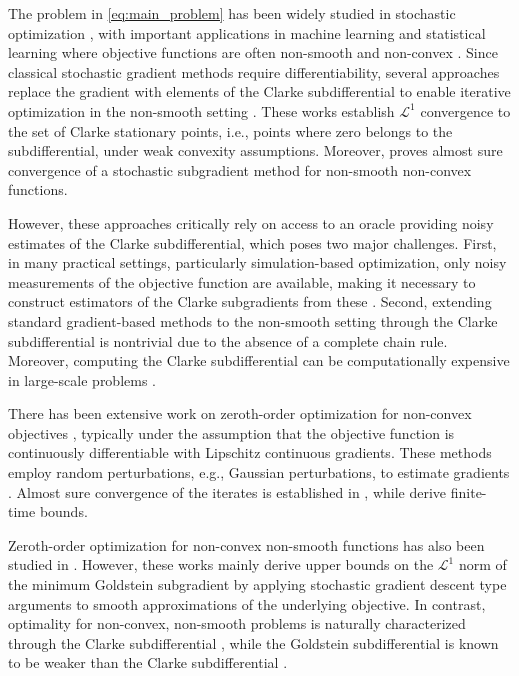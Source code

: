 \documentclass[9pt,journal,twoside,web]{ieeecolor}
\begin{document}
The problem in \eqref{eq:main_problem} has been widely studied in stochastic optimization \cite{ermoliev2003solution,bolte2021conservative,xu2019non,mai2020convergence,lin2022gradient}, with important applications in machine learning and statistical learning where objective functions are often non-smooth and non-convex \cite{bolte2021conservative}. Since classical stochastic gradient methods require differentiability, several approaches replace the gradient with elements of the Clarke subdifferential to enable iterative optimization in the non-smooth setting \cite{xu2019non,mai2020convergence}. These works establish $\mathcal{L}^1$ convergence to the set of Clarke stationary points, i.e., points where zero belongs to the subdifferential, under weak convexity assumptions. Moreover, \cite{bianchi2022convergence} proves almost sure convergence of a stochastic subgradient method for  non-smooth non-convex functions.

However, these approaches critically rely on access to an oracle providing noisy estimates of the Clarke subdifferential, which poses two major challenges. First, in many practical settings, particularly simulation-based optimization, only noisy measurements of the objective function are available, making it necessary to construct estimators of the  Clarke subgradients from these  \cite{prashanth2025gradient}. Second, extending standard gradient-based methods to the non-smooth setting through the Clarke subdifferential is nontrivial due to the absence of a complete chain rule. Moreover, computing the Clarke subdifferential can be computationally expensive in large-scale problems \cite{Nesterov2015RandomGM}.

There has been extensive work on zeroth-order optimization for non-convex objectives \cite{spall1992,B2007,SPP2013,ghadimi}, typically under the assumption that the objective function is continuously differentiable with Lipschitz continuous gradients. These methods employ random perturbations, e.g., Gaussian perturbations, to estimate gradients \cite{B2007,SPP2013,Nesterov2015RandomGM,ghadimi}. Almost sure convergence of the iterates is established in \cite{B2007,SPP2013,prashanth2025gradient,Ramaswami}, while \cite{Nesterov2015RandomGM,ghadimi} derive finite-time bounds.

Zeroth-order optimization for non-convex non-smooth functions has also been studied in \cite{lin2022gradient,chen2023faster,kornowski2024algorithm,liu2024zeroth}. However, these works mainly derive upper bounds on the $\mathcal{L}^1$ norm of the minimum Goldstein subgradient by applying stochastic gradient descent type arguments to smooth approximations of the underlying objective. In contrast, optimality for non-convex, non-smooth problems is naturally characterized through the Clarke subdifferential \cite{rockafellar1998variational}, while the Goldstein subdifferential is known to be weaker than the Clarke subdifferential \cite{lin2022gradient}.
\color{black}
\end{document}

